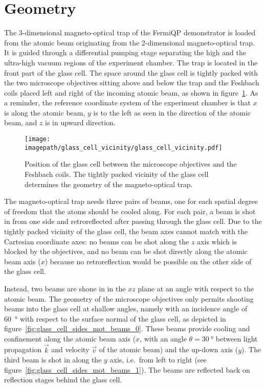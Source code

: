 
\section{Geometry}
The 3-dimensional magneto-optical trap of the FermiQP demonstrator is loaded from the atomic beam originating from the 2-dimensional magneto-optical trap. It is guided through a differential pumping stage separating the high and the ultra-high vacuum regions of the experiment chamber. The trap is located in the front part of the glass cell. The space around the glass cell is tightly packed with the two microscope objectives sitting above and below the trap and the Feshbach coils placed left and right of the incoming atomic beam, as shown in figure~\ref{fig:glass_cell_vicinity}. As a reminder, the reference coordinate system of the experiment chamber is that $x$ is along the atomic beam, $y$ is to the left as seen in the direction of the atomic beam, and $z$ is in upward direction.

\begin{figure}
    \centering
    \texttt{[image: \\imagepath/glass\_cell\_vicinity/glass\_cell\_vicinity.pdf]}
    \caption{Position of the glass cell between the microscope objectives and the Feshbach coils. The tightly packed vicinity of the glass cell determines the geometry of the magneto-optical trap.}\label{fig:glass_cell_vicinity}
\end{figure}

The magneto-optical trap needs three pairs of beams, one for each spatial degree of freedom that the atoms should be cooled along. For each pair, a beam is shot in from one side and retroreflected after passing through the glass cell. Due to the tightly packed vicinity of the glass cell, the beam axes cannot match with the Cartesian coordinate axes: no beams can be shot along the $z$ axis which is blocked by the objectives, and no beam can be shot directly along the atomic beam axis ($x$) because no retroreflection would be possible on the other side of the glass cell.

Instead, two beams are shone in in the $xz$ plane at an angle with respect to the atomic beam. The geometry of the microscope objectives only permits shooting beams into the glass cell at shallow angles, namely with an incidence angle of \SI{60}{\degree} with respect to the surface normal of the glass cell, as depicted in figure~\ref{fig:glass_cell_sides_mot_beams_0}. These beams provide cooling and confinement along the atomic beam axis ($x$, with an angle $\theta = \SI{30}{\degree}$ between light propagation $\vec k$ and velocity $\vec v$ of the atomic beam) and the up-down axis ($y$). The third beam is shot in along the $y$ axis, i.e.\ from left to right (see figure~\ref{fig:glass_cell_sides_mot_beams_1}). The beams are reflected back on reflection stages behind the glass cell.

